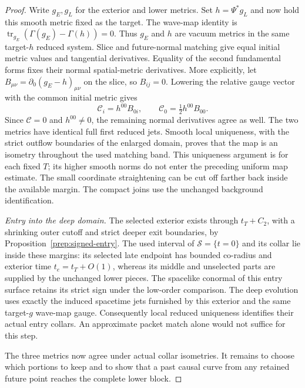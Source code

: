 \begin{proof}
Write $g_E,g_L$ for the exterior and lower metrics.
Set $h=\Psi^*g_L$ and now hold this
smooth metric fixed as the target. The wave-map identity is
$\operatorname{tr}_{g_E}(\Gamma(g_E)-\Gamma(h))=0$.
Thus $g_E$ and $h$ are vacuum metrics in the same target-$h$
reduced system. Slice and future-normal matching give equal initial
metric values and tangential derivatives. Equality of the second
fundamental forms fixes their normal spatial-metric derivatives.
More explicitly, let $B_{\mu\nu}=\partial_0(g_E-h)_{\mu\nu}$
on the slice, so $B_{ij}=0$. Lowering the relative gauge vector
with the common initial metric gives
\[
 \mathcal C_i=h^{00}B_{0i},\qquad
 \mathcal C_0=\tfrac12h^{00}B_{00}.
\]
Since $\mathcal C=0$ and $h^{00}\ne0$, the remaining normal
derivatives agree as well.
The two metrics have identical full first reduced jets. Smooth
local uniqueness, with the strict outflow boundaries of the
enlarged domain, proves that the map is an isometry throughout the
used matching band. This uniqueness argument is for each fixed $T$;
its higher smooth norms do not enter the preceding uniform map
estimate. The small coordinate straightening can be cut
off farther back inside the available margin. The compact joins use
the unchanged background identification.

\emph{Entry into the deep domain.}
The selected exterior exists through $t_T+C_2$, with a shrinking
outer cutoff and strict deeper exit boundaries, by
Proposition~\ref{prep:signed-entry}. The used interval of
$\mathcal S=\{t=0\}$ and its collar lie inside these margins: its
selected late endpoint has bounded co-radius and exterior time
$t_e=t_T+O(1)$, whereas its middle and unselected parts are supplied
by the unchanged lower pieces. The spacelike conormal of this entry
surface retains its strict sign under the low-order comparison.
The deep evolution uses exactly the induced spacetime jets furnished
by this exterior and the same target-$g$ wave-map gauge. Consequently
local reduced uniqueness identifies their actual entry collars.
An approximate packet match alone would not suffice for this step.

The three metrics now agree under actual collar isometries. It remains
to choose which portions to keep and to show that a past causal curve
from any retained future point reaches the complete lower block.


\end{proof}
